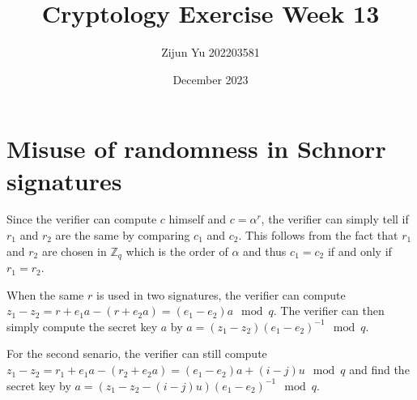 \documentclass{article}
\title{Cryptology Exercise Week 13}
\author{Zijun Yu 202203581}
\date{December 2023}
\begin{document}
\maketitle

\section*{Misuse of randomness in Schnorr signatures}

Since the verifier can compute $c$ himself and $c = \alpha^r$, the verifier can simply tell
if $r_1$ and $r_2$ are the same by comparing $c_1$ and $c_2$. This follows from the fact that $r_1$ and $r_2$ are chosen in $\mathbb{Z}_q$
which is the order of $\alpha$ and thus $c_1 = c_2$ if and only if $r_1 = r_2$.

When the same $r$ is used in two signatures, the verifier can compute $z_1 - z_2 = r + e_1 a - (r + e_2 a) = (e_1 - e_2) a \mod q$.
The verifier can then simply compute the secret key $a$ by $a = (z_1 - z_2) (e_1 - e_2)^{-1} \mod q$.

For the second senario, the verifier can still compute $z_1 - z_2 = r_1 + e_1 a - (r_2 + e_2 a) = (e_1 - e_2) a + (i - j) u \mod q$
and find the secret key by $a = (z_1 - z_2 - (i - j) u) (e_1 - e_2)^{-1} \mod q$.
\end{document}

